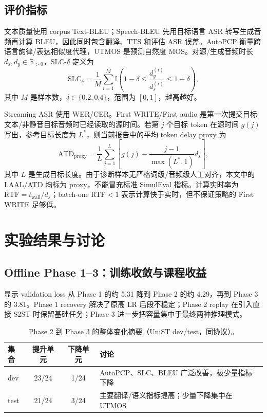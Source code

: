 \documentclass[11pt,a4paper]{article}
\newcommand{\R}{\mathbb{R}}
\begin{document}
\subsection{评价指标}

文本质量使用 corpus Text-BLEU；Speech-BLEU 先用目标语言 ASR 转写生成音频再计算 BLEU，因此同时包含翻译、TTS 和评估 ASR 误差。AutoPCP 衡量跨语言韵律/表达相似度代理，UTMOS 是预测自然度 MOS。对源/生成音频时长 $d_s,d_y\in\R_{>0}$，SLC-$\delta$ 定义为
\begin{equation}
 \mathrm{SLC}_{\delta}
 =\frac1M\sum_{i=1}^{M}
 \mathbb{I}\left(1-\delta\le\frac{d_y^{(i)}}{d_s^{(i)}}\le1+\delta\right),
 \label{eq:slc}
\end{equation}
其中 $M$ 是样本数，$\delta\in\{0.2,0.4\}$，范围为 $[0,1]$，越高越好。

Streaming ASR 使用 WER/CER。First WRITE/First audio 是第一次提交目标文本/非静音目标音频时已经读取的源时间。若第 $j$ 个目标 token 在源时间 $g(j)$ 写出，参考目标长度为 $L^*$，则当前报告中的平均 token delay proxy 为
\begin{equation}
 \mathrm{ATD}_{\mathrm{proxy}}
 =\frac{1}{L}\sum_{j=1}^{L}\left[g(j)-\frac{j-1}{\max(L^*,1)}d_s\right],
 \label{eq:atdproxy}
\end{equation}
其中 $L$ 是生成目标长度。由于诊断样本无严格词级/音频级人工对齐，本文中的 LAAL/ATD 均标为 proxy，不能冒充标准 SimulEval 指标。计算实时率为 $\mathrm{RTF}=t_{\mathrm{wall}}/d_s$；batch-one RTF$<1$ 表示计算快于实时，但不保证策略的 First WRITE 足够低。

\section{实验结果与讨论}

\subsection{Offline Phase 1--3：训练收敛与课程收益}

 显示 validation loss 从 Phase 1 的约 5.31 降到 Phase 2 的约 4.29，再到 Phase 3 的 3.81。Phase 1 recovery 解决了原高 LR 后段不稳定；Phase 2 replay 在引入直接 S2ST 时保留基础任务；Phase 3 进一步把容量集中于最终两种推理模式。

\begin{table}[H]
\centering
\caption{Phase 2 到 Phase 3 的整体变化摘要（UniST dev/test，同协议）。}
\label{tab:p2p3_summary}
\begin{tabularx}{\textwidth}{lCCY}
\toprule
集合 & 提升单元 & 下降单元 & 讨论 \\
\midrule
dev & 23/24 & 1/24 & AutoPCP、SLC、BLEU 广泛改善，极少量指标下降 \\
test & 21/24 & 3/24 & 主要翻译/语义指标提高；少量下降集中在 UTMOS \\
\bottomrule
\end{tabularx}
\end{table}
\end{document}
